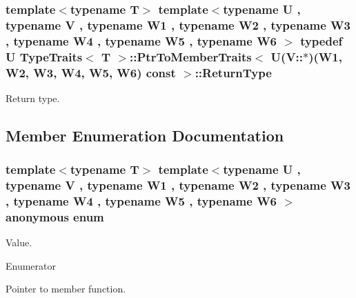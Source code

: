\subsubsection[{\texorpdfstring{Return\+Type}{ReturnType}}]{\setlength{\rightskip}{0pt plus 5cm}template$<$typename T$>$ template$<$typename U , typename V , typename W1 , typename W2 , typename W3 , typename W4 , typename W5 , typename W6 $>$ typedef U {\bf Type\+Traits}$<$ T $>$\+::{\bf Ptr\+To\+Member\+Traits}$<$ U(V\+::$\ast$)(W1, W2, W3, W4, W5, W6) const  $>$\+::{\bf Return\+Type}}\hypertarget{structTypeTraits_1_1PtrToMemberTraits_3_01U_07V_1_1_5_08_07W1_00_01W2_00_01W3_00_01W4_00_01W5_00_01W6_08_01const_01_01_4_a0c00d0db94c2628d0c882c991a074220}{}\label{structTypeTraits_1_1PtrToMemberTraits_3_01U_07V_1_1_5_08_07W1_00_01W2_00_01W3_00_01W4_00_01W5_00_01W6_08_01const_01_01_4_a0c00d0db94c2628d0c882c991a074220}
Return type. 

\subsection{Member Enumeration Documentation}
\subsubsection[{\texorpdfstring{anonymous enum}{anonymous enum}}]{\setlength{\rightskip}{0pt plus 5cm}template$<$typename T$>$ template$<$typename U , typename V , typename W1 , typename W2 , typename W3 , typename W4 , typename W5 , typename W6 $>$ anonymous enum}\hypertarget{structTypeTraits_1_1PtrToMemberTraits_3_01U_07V_1_1_5_08_07W1_00_01W2_00_01W3_00_01W4_00_01W5_00_01W6_08_01const_01_01_4_ae4bec95e83a2c79a3f8fe7c7f976d2ed}{}\label{structTypeTraits_1_1PtrToMemberTraits_3_01U_07V_1_1_5_08_07W1_00_01W2_00_01W3_00_01W4_00_01W5_00_01W6_08_01const_01_01_4_ae4bec95e83a2c79a3f8fe7c7f976d2ed}
Value. \begin{Desc}
\item[Enumerator]\par
\begin{description}
\item[{\em 
Is\+Pointer\+To\+Member\hypertarget{structTypeTraits_1_1PtrToMemberTraits_3_01U_07V_1_1_5_08_07W1_00_01W2_00_01W3_00_01W4_00_01W5_00_01W6_08_01const_01_01_4_ae4bec95e83a2c79a3f8fe7c7f976d2edad3efdf466cebc11a1f94825e1e9bebce}{}\label{structTypeTraits_1_1PtrToMemberTraits_3_01U_07V_1_1_5_08_07W1_00_01W2_00_01W3_00_01W4_00_01W5_00_01W6_08_01const_01_01_4_ae4bec95e83a2c79a3f8fe7c7f976d2edad3efdf466cebc11a1f94825e1e9bebce}
}]Pointer to member function. \end{description}
\end{Desc}

